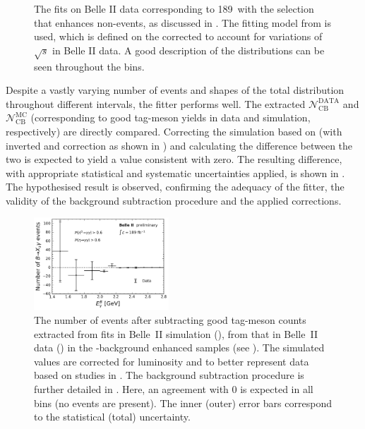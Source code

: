 \begin{figure}[htbp!]
{    }
    \caption{\label{fig:mbc_bbar_ehnhanced_fits_data}
    The fits on Belle II data corresponding to 189~\invfb with the selection 
    that enhances non-\BtoXsgamma events, as discussed in .
    The fitting model from  is used,
    which is defined on the corrected \Mbc to account for variations of $\sqrt{s}$ in Belle II data.
    A good description of the \Mbc distributions can be seen throughout the \EB bins.
    }
\end{figure}

Despite a vastly varying number of events and shapes of the total distribution throughout different \EB intervals,
the fitter performs well.
The extracted $\mathcal{N}_{\mathrm{CB}}^{\mathrm{DATA}}$ and $\mathcal{N}_{\mathrm{CB}}^{\mathrm{MC}}$ (corresponding to good tag-\B meson yields in data and simulation, respectively)
are directly compared.
Correcting the simulation based on  (with inverted \piVeto and \etaVeto correction as shown in ) and calculating the difference between the two is expected to yield a value consistent with zero.
The resulting difference, with appropriate statistical and systematic uncertainties applied, is shown in .
The hypothesised result is observed, confirming the adequacy of the fitter, the validity of the background subtraction procedure and the applied corrections.

\begin{figure}[htbp!]
    \centering
    \includegraphics[width=0.45\textwidth]{figures/data_validation/bbar_enhanced_event_counts.pdf}
    \caption{\label{fig:bbar_enhanced_background_subtraction}
    The number of events after subtracting good tag-\B meson counts extracted from fits in Belle~II simulation (),
    from that in Belle~II data () in the \BB-background enhanced samples (see ).
    The simulated values are corrected for luminosity and to better represent data based on studies in .
    The background subtraction procedure is further detailed in .
    Here, an agreement with 0 is expected in all \EB bins (no \BtoXsgamma events are present).
    The inner (outer) error bars correspond to the statistical (total) uncertainty.
    }
\end{figure}

